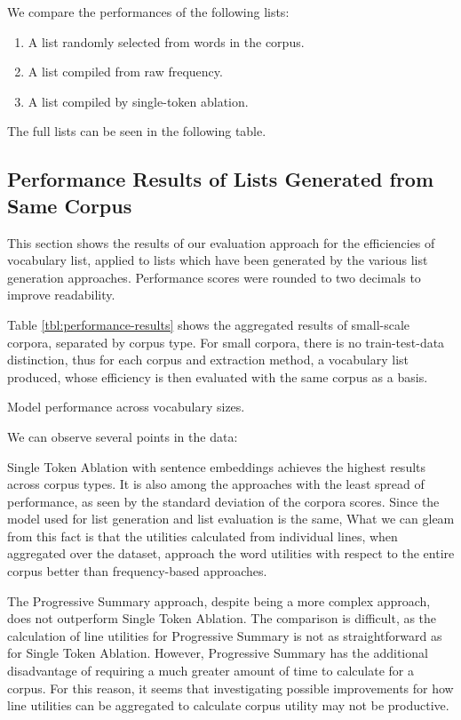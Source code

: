 We compare the performances of the following lists:
\begin{enumerate}
	\item A list randomly selected from words in the corpus.
	\item A list compiled from raw frequency.
	\item A list compiled by single-token ablation.
\end{enumerate}

The full lists can be seen in the following table.

\subsection{Performance Results of Lists Generated from Same Corpus} \label{sec:results-same-corpus}

This section shows the results of our evaluation approach for the efficiencies of vocabulary list, applied to lists which have been generated by the various list generation approaches.
Performance scores were rounded to two decimals to improve readability.


Table \ref{tbl:performance-results} shows the aggregated results of small-scale corpora, separated by corpus type.
For small corpora, there is no train-test-data distinction, thus for each corpus and extraction method, a vocabulary list produced, whose efficiency is then evaluated with the same corpus as a basis.

\begin{table}[ht]
	\centering
	
	\caption{Model performance across vocabulary sizes.}
	\label{tbl:performance-results}
\end{table}

We can observe several points in the data:

Single Token Ablation with sentence embeddings achieves the highest results across corpus types.
It is also among the approaches with the least spread of performance, as seen by the standard deviation of the corpora scores.
Since the model used for list generation and list evaluation is the same,
What we can gleam from this fact is that the utilities calculated from individual lines, when aggregated over the dataset, approach the word utilities with respect to the entire corpus better than frequency-based approaches.

The Progressive Summary approach, despite being a more complex approach, does not outperform Single Token Ablation.
The comparison is difficult, as the calculation of line utilities for Progressive Summary is not as straightforward as for Single Token Ablation.
However, Progressive Summary has the additional disadvantage of requiring a much greater amount of time to calculate for a corpus.
For this reason, it seems that investigating possible improvements for how line utilities can be aggregated to calculate corpus utility may not be productive.

